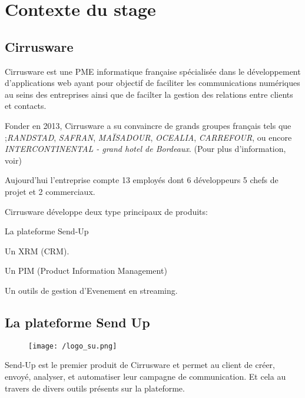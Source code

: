 \section{Contexte du stage}
\subsection{Cirrusware}
Cirrusware est une PME informatique française spécialisée dans le développement d'applications web ayant pour objectif de faciliter les communications numériques au seins des entreprises ainsi que de facilter la gestion des relations entre clients et contacts. 

Fonder en 2013, Cirrusware a su convaincre de grands groupes français tels que ;\textit{RANDSTAD}, \textit{SAFRAN}, \textit{MAÏSADOUR}, \textit{OCEALIA}, \textit{CARREFOUR}, ou encore \textit{INTERCONTINENTAL - grand hotel de Bordeaux}. (Pour plus d'information, voir) 

Aujourd'hui l'entreprise compte 13 employés dont 6 développeurs 5 chefs de projet et 2 commerciaux. 


Cirrusware développe deux type principaux de produits: 
\begin{list}{}{}
    \item La plateforme Send-Up\cite{sendup}
    \item Un XRM (CRM).
    \item Un PIM (Product Information Management)
    \item Un outils de gestion d'Evenement en streaming. 
\end{list}

\subsection{La plateforme Send Up}
\begin{figure}[!h]
\centering
    \texttt{[image: /logo\_su.png]}

\end{figure}
Send-Up est le premier produit de Cirrusware et permet au client de  créer, envoyé, analyser, et automatiser leur campagne de communication. Et cela au travers de divers outils présents sur la plateforme.


